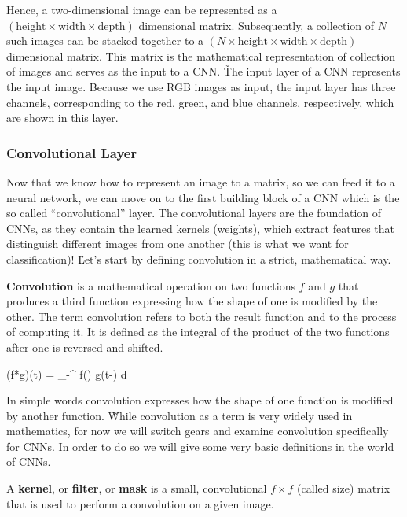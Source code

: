 
Hence, a two-dimensional image can be represented as a $(\text{height} \times \text{width} \times
\text{depth})$ dimensional matrix. Subsequently, a collection of $N$ such images can be stacked together to a $(N
\times \text{height} \times \text{width} \times \text{depth})$ dimensional matrix. This matrix is the
mathematical representation of collection of images and serves as the input to a CNN. \v

The input layer of a CNN represents the input image. Because we use RGB images as input, the input layer has three 
channels, corresponding to the red, green, and blue channels, respectively, which are shown in this layer.

\subsubsection*{Convolutional Layer}

Now that we know how to represent an image to a matrix, so we can feed it to a neural network, we can move on to the 
first building block of a CNN which is the so called ``convolutional'' layer. The convolutional layers are the 
foundation of CNNs, as they contain the learned kernels (weights), which extract features that distinguish different 
images from one another (this is what we want for classification)! \v

Let's start by defining convolution in a strict, mathematical way.

\bd[Convolution]
\textbf{Convolution} is a mathematical operation on two functions $f$ and $g$ that produces a third function 
expressing how the shape of one is modified by the other. The term convolution refers to both the result function and
to the process of computing it. It is defined as the integral of the product of the two functions after one is 
reversed and shifted. 

\bse 
(f*g)(t) = \int_{-\infty }^{\infty } f(\tau) g(t-\tau ) d\tau 
\ese 
\ed

In simple words convolution expresses how the shape of one function is modified by another function. \v

While convolution as a term is very widely used in mathematics, for now we will switch gears and examine convolution
specifically for CNNs. In order to do so we will give some very basic definitions in the world of CNNs.

A \textbf{kernel}, or \textbf{filter}, or \textbf{mask} is a small, convolutional $f \times f$ (called size) matrix 
that is used to perform a convolution on a given image. 
\ed


